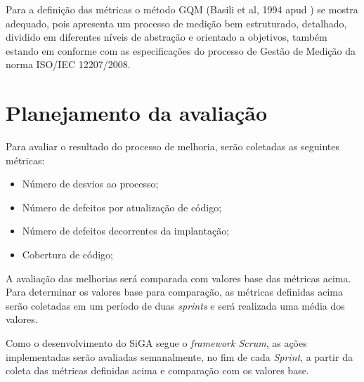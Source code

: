 Para a definição das métricas o método GQM (Basili et al, 1994 apud \cite{solingen99}) se mostra adequado, 
pois apresenta um processo de medição bem estruturado, detalhado, dividido em diferentes níveis de abstração
e orientado a objetivos, também estando em conforme com as especificações do processo de Gestão de Medição
da norma ISO/IEC 12207/2008.

\section{Planejamento da avaliação}
    
    Para avaliar o resultado do processo de melhoria, serão coletadas as seguintes métricas:
    
    \begin{itemize}
      \item Número de desvios ao processo;
      \item Número de defeitos por atualização de código;
      \item Número de defeitos decorrentes da implantação;
      \item Cobertura de código;
    \end{itemize}
    
    A avaliação das melhorias será comparada com valores base das métricas acima. Para determinar os valores base para comparação, 
    as métricas definidas acima serão coletadas em um período de duas \textit{sprints} e será realizada uma média dos valores.
    
    Como o desenvolvimento do SiGA segue o \textit{framework Scrum}, as ações implementadas serão avaliadas semanalmente,
    no fim de cada \textit{Sprint}, a partir da coleta das métricas definidas acima e comparação com os valores base.

